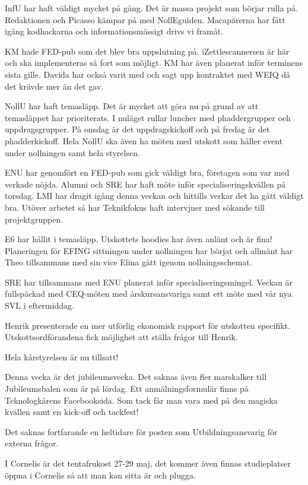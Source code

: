 \documentclass[10pt]{article}
\begin{document}
\begin{paragrafer}
\begin{paragrafer}
InfU har haft väldigt mycket på gång. Det är massa projekt som börjar rulla på. Redaktionen och Picasso kämpar på med NollEguiden. Macapärerna har fått igång kodhackarna och informationsmässigt drivs vi framåt.

KM hade FED-pub som det blev bra uppslutning på. iZettlescannersen är här och ska implementeras så fort som möjligt. KM har även planerat inför terminens sista gille. Davida har också varit med och sagt upp kontraktet med WEIQ då det krävde mer än det gav. 

NollU har haft temasläpp. Det är mycket att göra nu på grund av att temasläppet har prioriterats. I nuläget rullar luncher med phaddergrupper och uppdragsgrupper. På onsdag är det uppdragskickoff och på fredag är det phadderkickoff. Hela NollU ska även ha möten med utskott som håller event under nollningen samt hela styrelsen.

ENU har genomfört en FED-pub som gick väldigt bra, företagen som var med verkade nöjda. Alumni och SRE har haft möte inför specialiseringskvällen på torsdag.  LMI har dragit igång denna veckan och hittills verkar det ha gått väldigt bra. Utöver arbetet så har Teknikfokus haft intervjuer med sökande till projektgruppen.

E6 har hållit i temasläpp. Utskottets hoodies har även anlänt och är fina! Planeringen för EFING sittningen under nollningen har börjat och allmänt har Theo tillsammans med sin vice Elina gått igenom nollningsschemat.

SRE har tillsammans med ENU planerat inför specialiseringsmingel. Veckan är fullspäckad med CEQ-möten med årskursansvariga samt ett möte med vår nya SVL i eftermiddag.

Henrik presenterade en mer utförlig ekonomisk rapport för utskotten specifikt. Utskottsordförandena fick möjlighet att ställa frågor till Henrik.

Hela kårstyrelsen är nu tillsatt! 

Denna vecka är det jubileumsvecka. Det saknas även fler marskalker till Jubileumsbalen som är på lördag. Ett anmälningsformulär finns på Teknologkårens Facebooksida. Som tack får man vara med på den magiska kvällen samt en kick-off och tackfest!

Det saknas fortfarande en heltidare för posten som Utbildningsansvarig för externa frågor.

I Cornelis är det tentafrukost 27-29 maj, det kommer även finnas studieplatser öppna i Cornelis så att man kan sitta är och plugga.


\end{paragrafer}
\end{paragrafer}
\end{document}
